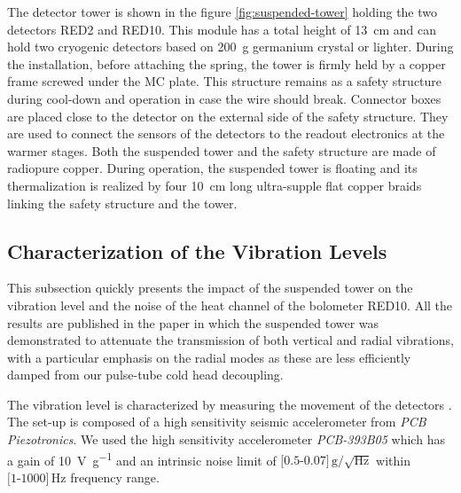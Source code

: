 The detector tower is shown in the figure \ref{fig:suspended-tower} holding the two detectors RED2 and RED10. This module has a total height of \SI{13}{\cm} and can hold two cryogenic detectors based on \SI{200}{\g} germanium crystal or lighter. During the installation, before attaching the spring, the tower is firmly held by a copper frame screwed under the MC plate. This structure remains as a safety structure during cool-down and operation in case the wire should break. Connector boxes are placed close to the detector on the external side of the safety structure. They are used to connect the sensors of the detectors to the readout electronics at the warmer stages. Both the suspended tower and the safety structure are made of radiopure  copper. During operation, the suspended tower is floating and its thermalization is realized by four \SI{10}{\cm} long ultra-supple flat copper braids linking the safety structure and the tower.


\subsection{Characterization of the Vibration Levels}

This subsection quickly presents the impact of the suspended tower on the vibration level and the noise of the heat channel of the bolometer RED10. All the results are published in the paper \cite{Maisonobe:2018tbq} in which the suspended tower was demonstrated to attenuate the transmission of both vertical and radial vibrations, with a particular emphasis on the radial modes as these are less efficiently damped from our pulse-tube cold head decoupling. 

The vibration level is characterized by measuring the movement of the detectors \cite{Olivieri:2017lqz}.
The set-up is composed of a high sensitivity seismic accelerometer from \emph{PCB Piezotronics}. We used the high sensitivity accelerometer \emph{PCB-393B05} which has a gain of \SI{10}{\volt\per g} and an intrinsic noise limit of $\textrm{[0.5-0.07]}\,\textrm{g}/\sqrt{\textrm{Hz}}$ within $\textrm{[1-1000]}\,\si{\Hz}$ frequency range.

